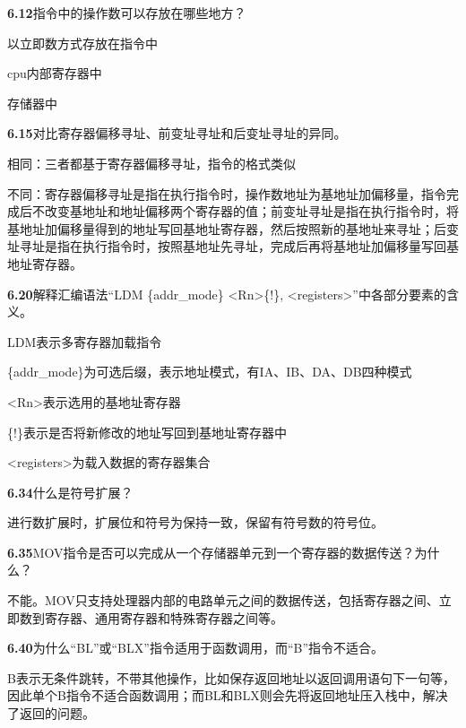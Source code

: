 \documentclass{article}
\begin{document}
    \noindent\textbf{6.12}指令中的操作数可以存放在哪些地方？\par
    以立即数方式存放在指令中\par
    cpu内部寄存器中\par
    存储器中
    \\[4pt]\par

    \noindent\textbf{6.15}对比寄存器偏移寻址、前变址寻址和后变址寻址的异同。\par
    相同：三者都基于寄存器偏移寻址，指令的格式类似\par
    不同：寄存器偏移寻址是指在执行指令时，操作数地址为基地址加偏移量，指令完成后不改变基地址和地址偏移两个寄存器的值；前变址寻址是指在执行指令时，将基地址加偏移量得到的地址写回基地址寄存器，然后按照新的基地址来寻址；后变址寻址是指在执行指令时，按照基地址先寻址，完成后再将基地址加偏移量写回基地址寄存器。
    \\[4pt]\par

    \noindent\textbf{6.20}解释汇编语法“LDM \{addr_mode\} <Rn>\{!\}, <registers>”中各部分要素的含义。\par
     LDM表示多寄存器加载指令\par
     \{addr_mode\}为可选后缀，表示地址模式，有IA、IB、DA、DB四种模式\par
     <Rn>表示选用的基地址寄存器\par
     \{!\}表示是否将新修改的地址写回到基地址寄存器中\par
     <registers>为载入数据的寄存器集合
    \\[4pt]\par

    \noindent\textbf{6.34}什么是符号扩展？\par
    进行数扩展时，扩展位和符号为保持一致，保留有符号数的符号位。
    \\[4pt]\par

    \noindent\textbf{6.35}MOV指令是否可以完成从一个存储器单元到一个寄存器的数据传送？为什么？\par
    不能。MOV只支持处理器内部的电路单元之间的数据传送，包括寄存器之间、立即数到寄存器、通用寄存器和特殊寄存器之间等。
    \\[4pt]\par

    \noindent\textbf{6.40}为什么“BL”或“BLX”指令适用于函数调用，而“B”指令不适合。\par
    B表示无条件跳转，不带其他操作，比如保存返回地址以返回调用语句下一句等，因此单个B指令不适合函数调用；而BL和BLX则会先将返回地址压入栈中，解决了返回的问题。
    \\[4pt]\par
\end{document}
